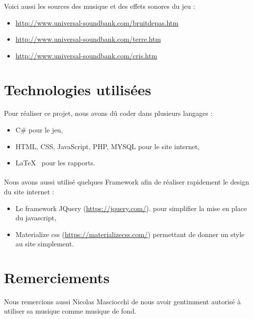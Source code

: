\documentclass[titlepage, 13px, a4paper]{report}
\begin{document}
Voici aussi les sources des musique et des effets sonores du jeu : \\
{\begin{itemize}
	\item \url{http://www.universal-soundbank.com/bruitdepas.htm}
	\item \url{http://www.universal-soundbank.com/terre.htm}
	\item \url{http://www.universal-soundbank.com/cris.htm} \\
\end{itemize}} 

\section{Technologies utilisées}
\paragraph{} \hspace{0pt}
Pour réaliser ce projet, nous avons dû coder dans plusieurs langages : 
{\begin{itemize}
	\item C\# pour le jeu, 
	\item HTML, CSS, JavaScript, PHP, MYSQL pour le site internet,
	\item \LaTeX ~ pour les rapports. \\
\end{itemize}}

\paragraph{} \hspace{0pt}
Nous avons aussi utilisé quelques Framework  afin de réaliser rapidement le design du site internet :
{\begin{itemize}
	\item Le framework JQuery (\url{https://jquery.com/}). pour simplifier la mise en place du javascript,
	\item Materialize css (\url{https://materializecss.com/}) permettant de donner un style au site simplement. \\
\end{itemize}}

\section{Remerciements}
\paragraph{} \hspace{0pt}
Nous remercions aussi Nicolas Masciocchi de nous avoir gentimment autorisé à utiliser sa musique comme musique de fond. \\
\end{document}
